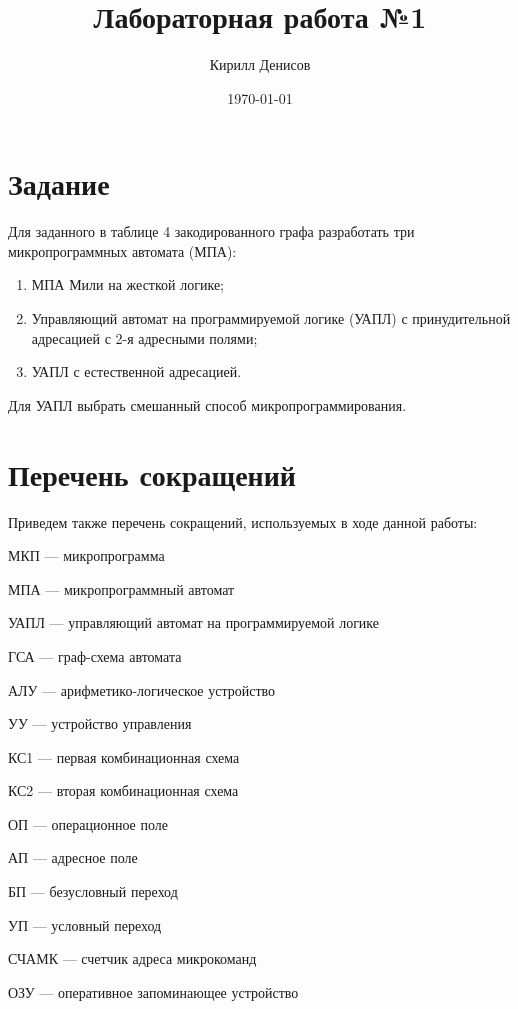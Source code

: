 \documentclass[a4paper,14pt]{extarticle}
\author{Кирилл Денисов}
\title{Лабораторная работа №1}
\date{\today}
\newcommand{\pathToCommonFolder}{/home/denilai/Documents/repos/latex/Common}
\begin{document}
	\thispagestyle{empty}
	
	\newpage
	\newpage

	
	\section{Задание}
	Для заданного в таблице 4 закодированного графа разработать три микропрограммных автомата (МПА):
	\begin{enumerate}
		\item МПА Мили на жесткой логике;
		\item Управляющий автомат на программируемой
		логике (УАПЛ) с принудительной адресацией с 2-я адресными полями;
		\item УАПЛ с естественной адресацией. 
	\end{enumerate}
	Для УАПЛ выбрать смешанный способ микропрограммирования.
	
	

	
\section{Перечень сокращений}
	Приведем также перечень сокращений, используемых в ходе данной работы:
	
	МКП --- микропрограмма
	
	МПА --- микропрограммный автомат
	
	УАПЛ --- управляющий автомат на программируемой логике
	
	ГСА --- граф-схема автомата
	
	АЛУ --- арифметико-логическое устройство
	
	УУ --- устройство управления
	
	КС1 --- первая комбинационная схема 
	
	КС2 --- вторая комбинационная схема 
	
	ОП --- операционное поле
	
	АП --- адресное поле 
	
	БП --- безусловный переход
	
	УП --- условный переход
	
	
	
	
	
	СЧАМК --- счетчик адреса микрокоманд
	
	ОЗУ  --- оперативное запоминающее устройство
	
\end{document}
